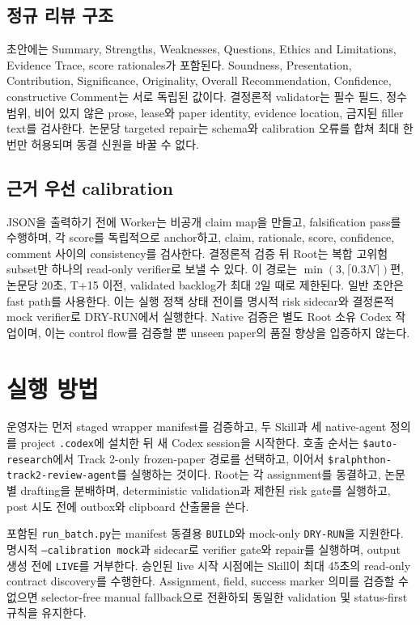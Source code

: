 \documentclass[11pt,a4paper]{article}
\begin{document}
\subsection{정규 리뷰 구조}

초안에는 Summary, Strengths, Weaknesses, Questions, Ethics and Limitations,
Evidence Trace, score rationales가 포함된다. Soundness, Presentation,
Contribution, Significance, Originality, Overall Recommendation, Confidence,
constructive Comment는 서로 독립된 값이다. 결정론적 validator는 필수 필드,
정수 범위, 비어 있지 않은 prose, lease와 paper identity, evidence location,
금지된 filler text를 검사한다. 논문당 targeted repair는 schema와 calibration
오류를 합쳐 최대 한 번만 허용되며 동결 신원을 바꿀 수 없다.

\subsection{근거 우선 calibration}

JSON을 출력하기 전에 Worker는 비공개 claim map을 만들고, falsification
pass를 수행하며, 각 score를 독립적으로 anchor하고, claim, rationale, score,
confidence, comment 사이의 consistency를 검사한다. 결정론적 검증 뒤 Root는
복합 고위험 subset만 하나의 read-only verifier로 보낼 수 있다. 이 경로는
$\min(3,\lceil 0.3N\rceil)$편, 논문당 20초, T+15 이전, validated backlog가
최대 2일 때로 제한된다. 일반 초안은 fast path를 사용한다. 이는 실행 정책
상태 전이를 명시적 risk sidecar와 결정론적 mock verifier로 DRY-RUN에서
실행한다. Native 검증은 별도 Root 소유 Codex 작업이며, 이는 control flow를
검증할 뿐 unseen paper의 품질 향상을 입증하지 않는다.

\section{실행 방법}

운영자는 먼저 staged wrapper manifest를 검증하고, 두 Skill과 세 native-agent
정의를 project \texttt{.codex}에 설치한 뒤 새 Codex session을 시작한다. 호출
순서는 \texttt{\$auto-research}에서 Track 2-only frozen-paper 경로를 선택하고,
이어서 \texttt{\$ralphthon-track2-review-agent}를 실행하는 것이다. Root는 각
assignment를 동결하고, 논문별 drafting을 분배하며, deterministic validation과
제한된 risk gate를 실행하고, post 시도 전에 outbox와 clipboard 산출물을 쓴다.

포함된 \texttt{run\_batch.py}는 manifest 동결용 \texttt{BUILD}와 mock-only
\texttt{DRY-RUN}을 지원한다. 명시적 \texttt{--calibration mock}과 sidecar로
verifier gate와 repair를 실행하며, output 생성 전에 \texttt{LIVE}를 거부한다.
승인된 live 시작 시점에는 Skill이 최대 45초의 read-only contract
discovery를 수행한다. Assignment, field, success marker 의미를 검증할 수 없으면
selector-free manual fallback으로 전환하되 동일한 validation 및 status-first
규칙을 유지한다.
\end{document}
